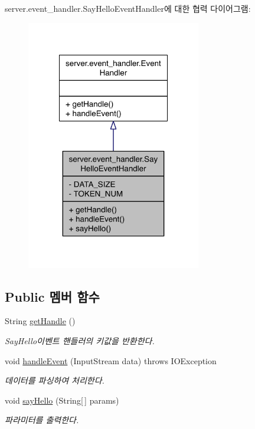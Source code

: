 server.\-event\-\_\-handler.\-Say\-Hello\-Event\-Handler에 대한 협력 다이어그램\-:\nopagebreak
\begin{figure}[H]
\begin{center}
\leavevmode
\includegraphics[width=216pt]{classserver_1_1event__handler_1_1_say_hello_event_handler__coll__graph}
\end{center}
\end{figure}
\subsection*{Public 멤버 함수}
\begin{DoxyCompactItemize}
\item 
String \hyperlink{classserver_1_1event__handler_1_1_say_hello_event_handler_afd6fc20f2320ef9335bfdffb352380a8}{get\-Handle} ()
\begin{DoxyCompactList}\small\item\em Say\-Hello이벤트 핸들러의 키값을 반환한다. \end{DoxyCompactList}\item 
void \hyperlink{classserver_1_1event__handler_1_1_say_hello_event_handler_afbbcd66f6fb06186e6aeff5f51111252}{handle\-Event} (Input\-Stream data)  throws I\-O\-Exception
\begin{DoxyCompactList}\small\item\em 데이터를 파싱하여 처리한다. \end{DoxyCompactList}\item 
void \hyperlink{classserver_1_1event__handler_1_1_say_hello_event_handler_a4a7b66fe140acb1a9c9b68f1a14d166f}{say\-Hello} (String\mbox{[}$\,$\mbox{]} params)
\begin{DoxyCompactList}\small\item\em 파라미터를 출력한다. \end{DoxyCompactList}\end{DoxyCompactItemize}
